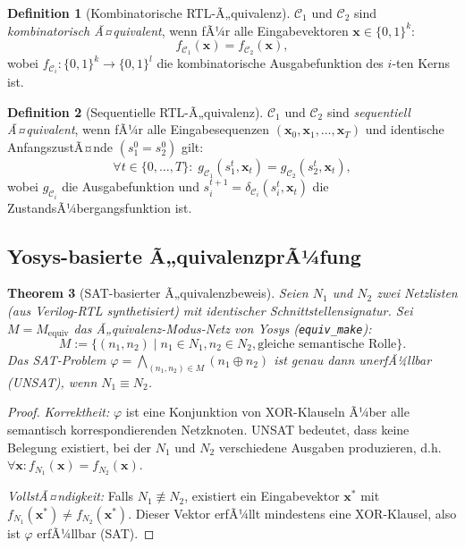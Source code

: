 ﻿\documentclass[a4paper,12pt]{article}
\theoremstyle{plain}
\newtheorem{theorem}{Theorem}[section]
\theoremstyle{definition}
\newtheorem{definition}[theorem]{Definition}
\theoremstyle{remark}
\begin{document}
\begin{definition}[Kombinatorische RTL-Ã„quivalenz]\label{def:rtl_equiv}
$\mathcal{C}_1$ und $\mathcal{C}_2$ sind \emph{kombinatorisch Ã¤quivalent},
wenn fÃ¼r alle Eingabevektoren $\mathbf{x} \in \{0,1\}^k$:
\[
  f_{\mathcal{C}_1}(\mathbf{x}) = f_{\mathcal{C}_2}(\mathbf{x}),
\]
wobei $f_{\mathcal{C}_i}: \{0,1\}^k \to \{0,1\}^l$ die kombinatorische
Ausgabefunktion des $i$-ten Kerns ist.
\end{definition}

\begin{definition}[Sequentielle RTL-Ã„quivalenz]\label{def:seq_equiv}
$\mathcal{C}_1$ und $\mathcal{C}_2$ sind \emph{sequentiell Ã¤quivalent},
wenn fÃ¼r alle Eingabesequenzen $(\mathbf{x}_0, \mathbf{x}_1, \ldots, \mathbf{x}_T)$
und identische AnfangszustÃ¤nde $(s_1^0 = s_2^0)$ gilt:
\[
  \forall t \in \{0,\ldots,T\}:\; g_{\mathcal{C}_1}(s_1^t, \mathbf{x}_t)
  = g_{\mathcal{C}_2}(s_2^t, \mathbf{x}_t),
\]
wobei $g_{\mathcal{C}_i}$ die Ausgabefunktion und
$s_i^{t+1} = \delta_{\mathcal{C}_i}(s_i^t, \mathbf{x}_t)$
die ZustandsÃ¼bergangsfunktion ist.
\end{definition}

\subsection{Yosys-basierte Ã„quivalenzprÃ¼fung}\label{ssec:yosys}

\begin{theorem}[SAT-basierter Ã„quivalenzbeweis]\label{thm:sat_equiv}
Seien $N_1$ und $N_2$ zwei Netzlisten (aus Verilog-RTL synthetisiert)
mit identischer Schnittstellensignatur. Sei $M = M_\mathrm{equiv}$
das Ã„quivalenz-Modus-Netz von Yosys (\texttt{equiv\_make}):
\[
  M := \{(n_1, n_2) \mid n_1 \in N_1, n_2 \in N_2,
        \text{gleiche semantische Rolle}\}.
\]
Das SAT-Problem $\varphi = \bigwedge_{(n_1,n_2) \in M} (n_1 \oplus n_2)$
ist genau dann \emph{unerfÃ¼llbar} (UNSAT), wenn $N_1 \equiv N_2$.
\end{theorem}
\begin{proof}
\textit{Korrektheit:}
$\varphi$ ist eine Konjunktion von XOR-Klauseln Ã¼ber alle
semantisch korrespondierenden Netzknoten. UNSAT bedeutet,
dass keine Belegung existiert, bei der $N_1$ und $N_2$
verschiedene Ausgaben produzieren, d.h.\ $\forall \mathbf{x}: f_{N_1}(\mathbf{x}) = f_{N_2}(\mathbf{x})$.

\textit{VollstÃ¤ndigkeit:}
Falls $N_1 \not\equiv N_2$, existiert ein Eingabevektor $\mathbf{x}^*$
mit $f_{N_1}(\mathbf{x}^*) \neq f_{N_2}(\mathbf{x}^*)$. Dieser Vektor
erfÃ¼llt mindestens eine XOR-Klausel, also ist $\varphi$ erfÃ¼llbar (SAT).
\end{proof}
\end{document}
